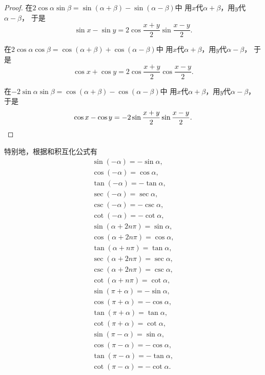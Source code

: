 \begin{theorem}[和积互化公式]
\begin{proof}
在\(2\cos\alpha\sin\beta = \sin(\alpha+\beta) - \sin(\alpha-\beta)\)中
用\(x\)代\(\alpha+\beta\)，用\(y\)代\(\alpha-\beta\)，
于是\[
	\sin x - \sin y = 2 \cos\frac{x+y}2 \sin\frac{x-y}2.
\]

在\(2\cos\alpha\cos\beta = \cos(\alpha+\beta) + \cos(\alpha-\beta)\)中
用\(x\)代\(\alpha+\beta\)，用\(y\)代\(\alpha-\beta\)，
于是\[
	\cos x + \cos y = 2 \cos\frac{x+y}2 \cos\frac{x-y}2.
\]

在\(-2\sin\alpha\sin\beta = \cos(\alpha+\beta) - \cos(\alpha-\beta)\)中
用\(x\)代\(\alpha+\beta\)，用\(y\)代\(\alpha-\beta\)，
于是\[
	\cos x - \cos y = -2 \sin\frac{x+y}2 \sin\frac{x-y}2.
	\qedhere
\]
\end{proof}
\end{theorem}

特别地，根据和积互化公式有\begin{gather}
	\sin(-\alpha) = -\sin\alpha, \\
	\cos(-\alpha) = \cos\alpha, \\
	\tan(-\alpha) = -\tan\alpha, \\
	\sec(-\alpha) = \sec\alpha, \\
	\csc(-\alpha) = -\csc\alpha, \\
	\cot(-\alpha) = -\cot\alpha, \\
	\sin(\alpha+2n\pi) = \sin\alpha, \\
	\cos(\alpha+2n\pi) = \cos\alpha, \\
	\tan(\alpha+n\pi) = \tan\alpha, \\
	\sec(\alpha+2n\pi) = \sec\alpha, \\
	\csc(\alpha+2n\pi) = \csc\alpha, \\
	\cot(\alpha+n\pi) = \cot\alpha, \\
	\sin(\pi+\alpha) = -\sin\alpha,
		\label{equation:函数.三角函数.诱导公式1} \\
	\cos(\pi+\alpha) = -\cos\alpha,
		\label{equation:函数.三角函数.诱导公式2} \\
	\tan(\pi+\alpha) = \tan\alpha,
		\label{equation:函数.三角函数.诱导公式3} \\
	\cot(\pi+\alpha) = \cot\alpha,
		\label{equation:函数.三角函数.诱导公式4} \\
	\sin(\pi-\alpha) = \sin\alpha,
		\label{equation:函数.三角函数.诱导公式5} \\
	\cos(\pi-\alpha) = -\cos\alpha,
		\label{equation:函数.三角函数.诱导公式6} \\
	\tan(\pi-\alpha) = -\tan\alpha,
		\label{equation:函数.三角函数.诱导公式7} \\
	\cot(\pi-\alpha) = -\cot\alpha.
		\label{equation:函数.三角函数.诱导公式8}
\end{gather}
